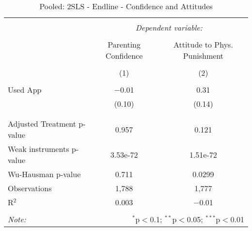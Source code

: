 
\begin{table}[!htbp] \centering 
  \caption{Pooled: 2SLS - Endline - Confidence and Attitudes} 
  \label{tbl:Pooled: 2SLS - Endline - Confidence and Attitudes} 
\begin{tabular}{@{\extracolsep{5pt}}lcc} 
\\[-1.8ex]\hline 
\hline \\[-1.8ex] 
 & \multicolumn{2}{c}{\textit{Dependent variable:}} \\ 
\cline{2-3} 
\\[-1.8ex] & Parenting Confidence & Attitude to Phys. Punishment \\ 
\\[-1.8ex] & (1) & (2)\\ 
\hline \\[-1.8ex] 
 Used App & $-$0.01 & 0.31 \\ 
  & (0.10) & (0.14) \\ 
  & & \\ 
\hline \\[-1.8ex] 
Adjusted Treatment p-value & 0.957 & 0.121 \\ 
Weak instruments p-value & 3.53e-72 & 1.51e-72 \\ 
Wu-Hausman p-value & 0.711 & 0.0299 \\ 
Observations & 1,788 & 1,777 \\ 
R$^{2}$ & 0.003 & $-$0.01 \\ 
\hline 
\hline \\[-1.8ex] 
\textit{Note:}  & \multicolumn{2}{r}{$^{*}$p$<$0.1; $^{**}$p$<$0.05; $^{***}$p$<$0.01} \\ 
\end{tabular} 
\end{table} 

